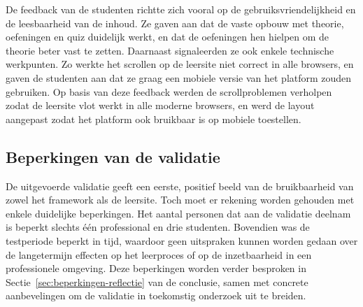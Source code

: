 De feedback van de studenten richtte zich vooral op de gebruiksvriendelijkheid en de leesbaarheid van de inhoud.
Ze gaven aan dat de vaste opbouw met theorie, oefeningen en quiz duidelijk werkt, en dat de oefeningen hen hielpen om de theorie beter vast te zetten.
Daarnaast signaleerden ze ook enkele technische werkpunten. Zo werkte het scrollen op de leersite niet correct in alle browsers, en gaven de studenten aan dat ze graag een mobiele versie van het platform zouden gebruiken.
Op basis van deze feedback werden de scrollproblemen verholpen zodat de leersite vlot werkt in alle moderne browsers, en werd de layout aangepast zodat het platform ook bruikbaar is op mobiele toestellen.

\subsection{Beperkingen van de validatie}%
\label{sec:validatie-beperkingen}

De uitgevoerde validatie geeft een eerste, positief beeld van de bruikbaarheid van zowel het framework als de leersite. 
Toch moet er rekening worden gehouden met enkele duidelijke beperkingen.
Het aantal personen dat aan de validatie deelnam is beperkt slechts één professional en drie studenten.
Bovendien was de testperiode beperkt in tijd, waardoor geen uitspraken kunnen worden gedaan over de langetermijn effecten op het leerproces of op de inzetbaarheid in een professionele omgeving.
Deze beperkingen worden verder besproken in Sectie~\ref{sec:beperkingen-reflectie} van de conclusie, samen met concrete aanbevelingen om de validatie in toekomstig onderzoek uit te breiden.


